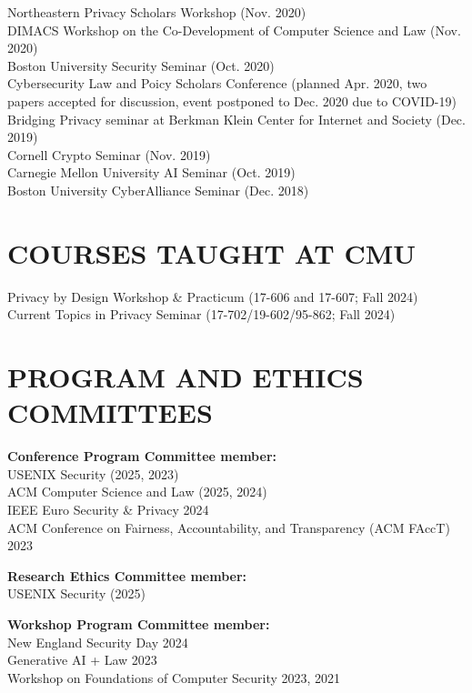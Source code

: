 \documentclass{res}
\begin{document}
\begin{resume}
Northeastern Privacy Scholars Workshop (Nov. 2020) \\
DIMACS Workshop on the Co-Development of Computer Science and Law (Nov. 2020) \\
Boston University Security Seminar (Oct. 2020) \\
Cybersecurity Law and Poicy Scholars Conference (planned Apr. 2020, two papers accepted for
discussion, event postponed to Dec. 2020 due to COVID-19) \\
Bridging Privacy seminar at Berkman Klein Center for Internet and Society (Dec. 2019) \\ 
Cornell Crypto Seminar (Nov. 2019) \\
Carnegie Mellon University AI Seminar (Oct. 2019) \\
Boston University CyberAlliance Seminar (Dec. 2018)

\section{COURSES TAUGHT AT CMU}
Privacy by Design Workshop \& Practicum (17-606 and 17-607; Fall 2024) \\
Current Topics in Privacy Seminar (17-702/19-602/95-862; Fall 2024)



\section{PROGRAM AND ETHICS COMMITTEES}
\vspace{0.1in}

\textbf{Conference Program Committee member:} \\
USENIX Security (2025, 2023) \\
ACM Computer Science and Law (2025, 2024) \\
IEEE Euro Security \& Privacy 2024 \\
ACM Conference on Fairness, Accountability, and Transparency (ACM FAccT) 2023

\textbf{Research Ethics Committee member:} \\
USENIX Security (2025)

\textbf{Workshop Program Committee member:} \\
New England Security Day 2024 \\
Generative AI + Law 2023 \\
Workshop on Foundations of Computer Security 2023, 2021


\end{resume}
\end{document}
